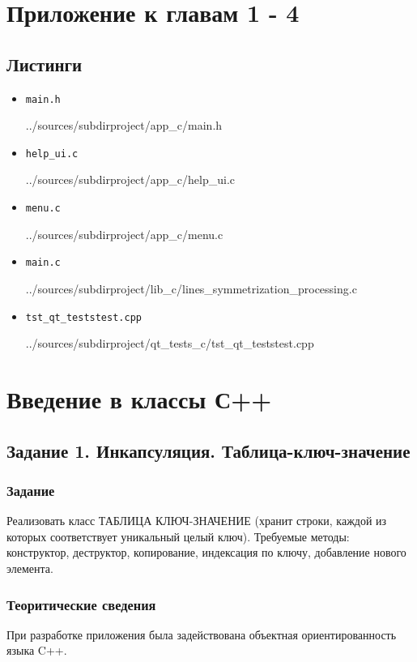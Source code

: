 \documentclass[12pt,a4paper]{report}
\begin{document}
\chapter{Приложение к главам 1 - 4}

\section{Листинги}
\begin{itemize}
\item[] \verb-main.h-

{../sources/subdirproject/app_c/main.h}

\item[] \verb-help_ui.c-

{../sources/subdirproject/app_c/help_ui.c}

\item[] \verb-menu.c-

{../sources/subdirproject/app_c/menu.c}

\item[] \verb-main.c-

{../sources/subdirproject/lib_c/lines_symmetrization_processing.c}

\item[] \verb-tst_qt_teststest.cpp-

{../sources/subdirproject/qt_tests_c/tst_qt_teststest.cpp}
\end{itemize}
%

\chapter{Введение в классы С++}
\section{Задание 1. Инкапсуляция. Таблица-ключ-значение}
\subsection{Задание}
\hspace{\parindent}
Реализовать класс ТАБЛИЦА КЛЮЧ-ЗНАЧЕНИЕ (хранит строки, каждой из которых соответствует уникальный целый ключ). Требуемые методы: конструктор, деструктор, копирование, индексация по ключу, добавление нового элемента.
\subsection{Теоритические сведения}
\hspace{\parindent}
При разработке приложения была задействована объектная ориентированность языка C++. 
\end{document}
